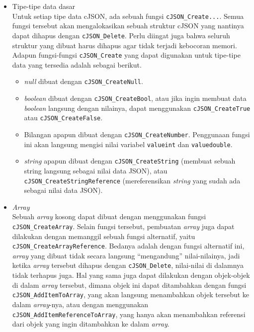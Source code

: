 \begin{itemize}[listparindent=\parindent]
	\item Tipe-tipe data dasar\\
	Untuk setiap tipe data cJSON, ada sebuah fungsi \verb|cJSON_Create...|. Semua fungsi \mbox{tersebut} akan mengalokasikan sebuah struktur cJSON yang nantinya dapat dihapus dengan \verb|cJSON_Delete|. Perlu diingat juga bahwa seluruh struktur yang dibuat harus dihapus agar tidak terjadi kebocoran memori. Adapun fungsi-fungsi \verb|cJSON_Create| yang dapat digunakan untuk tipe-tipe data yang tersedia adalah sebagai berikut.
	
	\begin{itemize}
		\item \textit{null} dibuat dengan \verb|cJSON_CreateNull|.
		\item \textit{boolean} dibuat dengan \verb|cJSON_CreateBool|, atau jika ingin membuat data \textit{boolean} langsung dengan nilainya, dapat menggunakan \verb|cJSON_CreateTrue| atau \verb|cJSON_CreateFalse|.
		\item Bilangan apapun dibuat dengan \verb|cJSON_CreateNumber|. Penggunaan fungsi ini akan langsung mengisi nilai variabel \verb|valueint| dan \verb|valuedouble|.
		\item \textit{string} apapun dibuat dengan \verb|cJSON_CreateString| (membuat sebuah string langsung sebagai nilai data JSON), atau \verb|cJSON_CreateStringReference| (mereferensikan \textit{string} yang sudah ada sebagai nilai data JSON).
	\end{itemize}
	
	\item \textit{Array}\\
	Sebuah \textit{array} kosong dapat dibuat dengan menggunakan fungsi \verb|cJSON_CreateArray|. Selain fungsi tersebut, pembuatan \textit{array} juga dapat dilakukan dengan memanggil sebuah fungsi alternatif, yaitu \verb|cJSON_CreateArrayReference|. Bedanya adalah dengan fungsi alternatif ini, \textit{array} yang dibuat tidak secara langsung ``mengandung'' nilai-nilainya, jadi ketika \textit{array} tersebut dihapus dengan \verb|cJSON_Delete|, nilai-nilai di dalamnya tidak terhapus juga. Hal yang sama juga dapat dilakukan dengan objek-objek di dalam \textit{array} tersebut, dimana objek ini dapat ditambahkan dengan fungsi \verb|cJSON_AddItemToArray|, yang akan langsung menambahkan objek tersebut ke dalam \textit{array}-nya, atau dengan menggunakan \verb|cJSON_AddItemReferenceToArray|, yang hanya akan menambahkan referensi dari objek yang ingin ditambahkan ke dalam \textit{array}.
	

\end{itemize}
